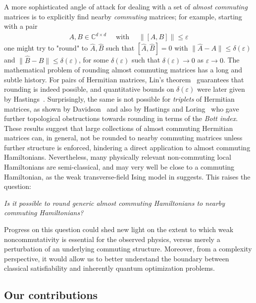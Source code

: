 \documentclass[a4paper,onecolumn,11pt]{quantumarticle}
\theoremstyle{plain}
\newcommand{\eps}{\varepsilon}
\begin{document}
A more sophisticated angle of attack for dealing with a set of \emph{almost commuting} matrices is to explicitly find nearby \emph{commuting} matrices; for example, starting with a pair
\begin{align}
A,B \in \mathbb{C}^{d \times d}\quad \text{ with } \quad \|[A,B]\| \leq \eps    
\end{align}
one might try to "round" to $\hat{A},\hat{B}$ such that $[\hat A,\hat B]=0$ with $\|\hat A-A\| \leq \delta(\eps)$ and
$\|\hat B-B\| \leq \delta(\eps)$, for some $\delta(\eps)$ such that $\delta(\eps) \rightarrow 0$ as $\eps \rightarrow 0$.
The mathematical problem of rounding almost commuting matrices has a long and subtle history.  For pairs of 
Hermitian matrices, Lin's theorem~\cite{Lin1997} guarantees that rounding is indeed possible, and
quantitative bounds on $\delta(\eps)$ were later given by Hastings~\cite{Hastings_2009,herrera2022hastingsapproachlinstheorem}.  
Surprisingly, the same is not possible for \emph{triplets} of Hermitian matrices, as shown by Davidson~\cite{Davidson1985} and also by 
Hastings and Loring~\cite{Hastings_2010} who gave further topological obstructions towards rounding in terms of the \emph{Bott index}. These results suggest that large collections of almost commuting Hermitian matrices can, in general, not be rounded to nearby commuting matrices unless further structure is enforced, hindering a direct application to almost commuting Hamiltonians. Nevertheless, many physically relevant non-commuting local Hamiltonians are semi-classical, and may very well be close to a commuting Hamiltonian, as the weak transverse-field Ising model in  suggests. This raises the question:
\begin{center}
\emph{Is it possible to round generic almost commuting Hamiltonians
to nearby commuting Hamiltonians?}
\end{center}



Progress on this question could shed new light on the extent to which weak noncommutativity is essential for the observed physics, versus merely a perturbation of an underlying commuting structure. Moreover, from a complexity perspective, it would allow us to better understand the boundary between classical satisfiability and inherently quantum optimization problems.



\subsection{Our contributions}
\end{document}
